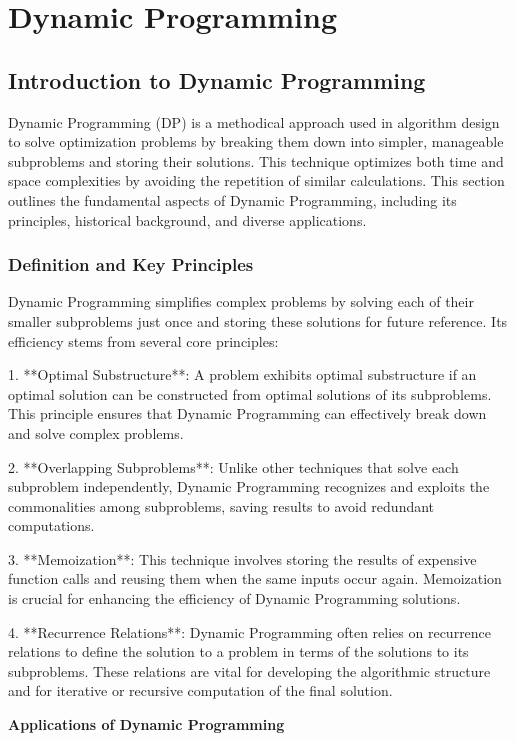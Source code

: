 \documentclass[12pt]{book} %
\begin{document}
\chapter{Dynamic Programming}
\section{Introduction to Dynamic Programming}

Dynamic Programming (DP) is a methodical approach used in algorithm design to solve optimization problems by breaking them down into simpler, manageable subproblems and storing their solutions. This technique optimizes both time and space complexities by avoiding the repetition of similar calculations. This section outlines the fundamental aspects of Dynamic Programming, including its principles, historical background, and diverse applications.

\subsection{Definition and Key Principles}

Dynamic Programming simplifies complex problems by solving each of their smaller subproblems just once and storing these solutions for future reference. Its efficiency stems from several core principles:

1. **Optimal Substructure**: A problem exhibits optimal substructure if an optimal solution can be constructed from optimal solutions of its subproblems. This principle ensures that Dynamic Programming can effectively break down and solve complex problems.

2. **Overlapping Subproblems**: Unlike other techniques that solve each subproblem independently, Dynamic Programming recognizes and exploits the commonalities among subproblems, saving results to avoid redundant computations.

3. **Memoization**: This technique involves storing the results of expensive function calls and reusing them when the same inputs occur again. Memoization is crucial for enhancing the efficiency of Dynamic Programming solutions.

4. **Recurrence Relations**: Dynamic Programming often relies on recurrence relations to define the solution to a problem in terms of the solutions to its subproblems. These relations are vital for developing the algorithmic structure and for iterative or recursive computation of the final solution.

\textbf{Applications of Dynamic Programming}
\end{document}
